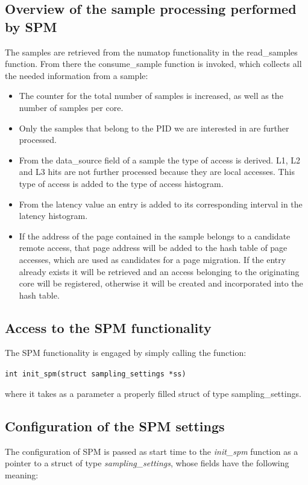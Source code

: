 \subsection{Overview of the sample processing performed by SPM}\label{subsection:ov-samplproc}
The samples are retrieved from the numatop functionality in the read\_samples function. From there the consume\_sample function is invoked, which collects all the needed information from a sample: 

\begin{itemize}
	\item The counter for the total number of samples is increased, as well as the number of samples per core.
	\item Only the samples that belong to the PID we are interested in are further processed.
	\item From the data\_source field of a sample the type of access is derived. L1, L2 and L3 hits are not further processed because they are local accesses. This type of access is added to the type of access histogram.
	\item From the latency value an entry is added to its corresponding interval in the latency histogram.
	\item If the address of the page contained in the sample belongs to a candidate remote access, that page address will be added to the hash table of page accesses, which are used as candidates for a page migration. If the entry already exists it will be retrieved and an access belonging to the originating core will be registered, otherwise it will be created and incorporated into the hash table.
\end{itemize}



\subsection{Access to the SPM functionality}\label{subsection:spm-access}
The SPM functionality is engaged by simply calling the function: 

\begin{center}
\texttt{int init\_spm(struct sampling\_settings *ss)} 
\end{center}

where it takes as a parameter a properly filled struct of type sampling\_settings.

\subsection{Configuration of the SPM settings}\label{subsection:spm-settings}
The configuration of SPM is passed as start time to the \textit{init\_spm} function as a pointer to a struct of type \textit{sampling\_settings}, whose fields have the following meaning:

